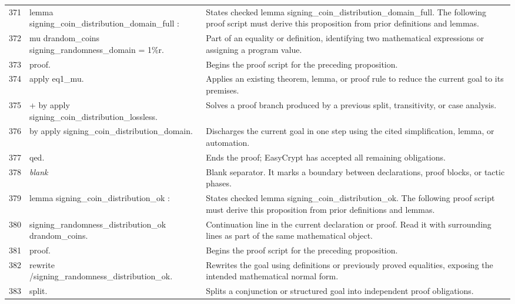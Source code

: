 \documentclass[10pt]{article}
\begin{document}
\begin{longtable}{r L{0.53\textwidth} L{0.37\textwidth}}
371 & {\ttfamily\scriptsize lemma signing\_coin\_distribution\_domain\_full :} & States checked lemma signing\_coin\_distribution\_domain\_full.  The following proof script must derive this proposition from prior definitions and lemmas. \\
372 & {\ttfamily\scriptsize   mu drandom\_coins signing\_randomness\_domain = 1\%r.} & Part of an equality or definition, identifying two mathematical expressions or assigning a program value. \\
373 & {\ttfamily\scriptsize proof.} & Begins the proof script for the preceding proposition. \\
374 & {\ttfamily\scriptsize apply eq1\_mu.} & Applies an existing theorem, lemma, or proof rule to reduce the current goal to its premises. \\
375 & {\ttfamily\scriptsize + by apply signing\_coin\_distribution\_lossless.} & Solves a proof branch produced by a previous split, transitivity, or case analysis. \\
376 & {\ttfamily\scriptsize by apply signing\_coin\_distribution\_domain.} & Discharges the current goal in one step using the cited simplification, lemma, or automation. \\
377 & {\ttfamily\scriptsize qed.} & Ends the proof; EasyCrypt has accepted all remaining obligations. \\
378 & {\ttfamily\scriptsize \emph{blank}} & Blank separator.  It marks a boundary between declarations, proof blocks, or tactic phases. \\
379 & {\ttfamily\scriptsize lemma signing\_coin\_distribution\_ok :} & States checked lemma signing\_coin\_distribution\_ok.  The following proof script must derive this proposition from prior definitions and lemmas. \\
380 & {\ttfamily\scriptsize   signing\_randomness\_distribution\_ok drandom\_coins.} & Continuation line in the current declaration or proof.  Read it with surrounding lines as part of the same mathematical object. \\
381 & {\ttfamily\scriptsize proof.} & Begins the proof script for the preceding proposition. \\
382 & {\ttfamily\scriptsize rewrite /signing\_randomness\_distribution\_ok.} & Rewrites the goal using definitions or previously proved equalities, exposing the intended mathematical normal form. \\
383 & {\ttfamily\scriptsize split.} & Splits a conjunction or structured goal into independent proof obligations. \\

\end{longtable}
\end{document}
